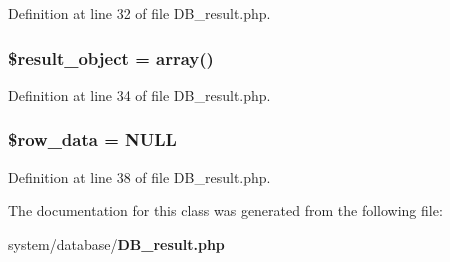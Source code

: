 Definition at line 32 of file D\-B\-\_\-result.\-php.

\subsubsection[{\$result\-\_\-object}]{\setlength{\rightskip}{0pt plus 5cm}\${\bf result\-\_\-object} = array()}\label{class_c_i___d_b__result_aa292cbb3dbb8c654cb4f6c61f250efd3}


Definition at line 34 of file D\-B\-\_\-result.\-php.

\subsubsection[{\$row\-\_\-data}]{\setlength{\rightskip}{0pt plus 5cm}\$row\-\_\-data = N\-U\-L\-L}\label{class_c_i___d_b__result_a335b4c27a1529df9e484e044e470ec07}


Definition at line 38 of file D\-B\-\_\-result.\-php.



The documentation for this class was generated from the following file\-:\begin{DoxyCompactItemize}
\item 
system/database/{\bf D\-B\-\_\-result.\-php}\end{DoxyCompactItemize}
